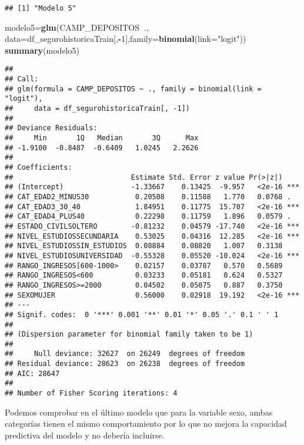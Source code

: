 \documentclass[]{article}
\newenvironment{Shaded}{\begin{snugshade}}{\end{snugshade}}
\newcommand{\KeywordTok}[1]{\textcolor[rgb]{0.13,0.29,0.53}{\textbf{#1}}}
\newcommand{\DataTypeTok}[1]{\textcolor[rgb]{0.13,0.29,0.53}{#1}}
\newcommand{\DecValTok}[1]{\textcolor[rgb]{0.00,0.00,0.81}{#1}}
\newcommand{\StringTok}[1]{\textcolor[rgb]{0.31,0.60,0.02}{#1}}
\newcommand{\OperatorTok}[1]{\textcolor[rgb]{0.81,0.36,0.00}{\textbf{#1}}}
\newcommand{\NormalTok}[1]{#1}
\begin{document}
\begin{verbatim}
## [1] "Modelo 5"
\end{verbatim}

\begin{Shaded}
\begin{Highlighting}[]
\NormalTok{modelo5=}\KeywordTok{glm}\NormalTok{(CAMP_DEPOSITOS}\OperatorTok{~}\NormalTok{., }\DataTypeTok{data=}\NormalTok{df_segurohistoricaTrain[,}\OperatorTok{-}\DecValTok{1}\NormalTok{],}\DataTypeTok{family=}\KeywordTok{binomial}\NormalTok{(}\DataTypeTok{link=}\StringTok{"logit"}\NormalTok{))}
\KeywordTok{summary}\NormalTok{(modelo5)}
\end{Highlighting}
\end{Shaded}

\begin{verbatim}
## 
## Call:
## glm(formula = CAMP_DEPOSITOS ~ ., family = binomial(link = "logit"), 
##     data = df_segurohistoricaTrain[, -1])
## 
## Deviance Residuals: 
##     Min       1Q   Median       3Q      Max  
## -1.9100  -0.8487  -0.6409   1.0245   2.2626  
## 
## Coefficients:
##                            Estimate Std. Error z value Pr(>|z|)    
## (Intercept)                -1.33667    0.13425  -9.957   <2e-16 ***
## CAT_EDAD2_MINUS30           0.20508    0.11588   1.770   0.0768 .  
## CAT_EDAD3_30_40             1.84951    0.11775  15.707   <2e-16 ***
## CAT_EDAD4_PLUS40            0.22298    0.11759   1.896   0.0579 .  
## ESTADO_CIVILSOLTERO        -0.81232    0.04579 -17.740   <2e-16 ***
## NIVEL_ESTUDIOSSECUNDARIA    0.53025    0.04316  12.285   <2e-16 ***
## NIVEL_ESTUDIOSSIN_ESTUDIOS  0.08884    0.08820   1.007   0.3138    
## NIVEL_ESTUDIOSUNIVERSIDAD  -0.55328    0.05520 -10.024   <2e-16 ***
## RANGO_INGRESOS[600-1000>    0.02157    0.03787   0.570   0.5689    
## RANGO_INGRESOS<600          0.03233    0.05181   0.624   0.5327    
## RANGO_INGRESOS>=2000        0.04502    0.05075   0.887   0.3750    
## SEXOMUJER                   0.56000    0.02918  19.192   <2e-16 ***
## ---
## Signif. codes:  0 '***' 0.001 '**' 0.01 '*' 0.05 '.' 0.1 ' ' 1
## 
## (Dispersion parameter for binomial family taken to be 1)
## 
##     Null deviance: 32627  on 26249  degrees of freedom
## Residual deviance: 28623  on 26238  degrees of freedom
## AIC: 28647
## 
## Number of Fisher Scoring iterations: 4
\end{verbatim}

Podemos comprobar en el último modelo que para la variable sexo, ambas
categorías tienen el mismo comportamiento por lo que no mejora la
capacidad predictiva del modelo y no debería incluirse.
\end{document}
